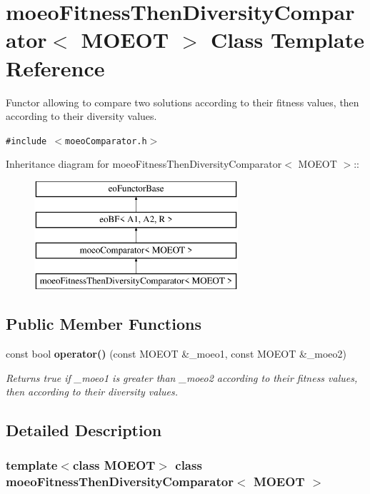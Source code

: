 \section{moeo\-Fitness\-Then\-Diversity\-Comparator$<$ MOEOT $>$ Class Template Reference}
\label{classmoeoFitnessThenDiversityComparator}
Functor allowing to compare two solutions according to their fitness values, then according to their diversity values.  


{\tt \#include $<$moeo\-Comparator.h$>$}

Inheritance diagram for moeo\-Fitness\-Then\-Diversity\-Comparator$<$ MOEOT $>$::\begin{figure}[H]
\begin{center}
\leavevmode
\includegraphics[height=4cm]{classmoeoFitnessThenDiversityComparator}
\end{center}
\end{figure}
\subsection*{Public Member Functions}
\begin{CompactItemize}
\item 
const bool {\bf operator()} (const MOEOT \&\_\-moeo1, const MOEOT \&\_\-moeo2)
\begin{CompactList}\small\item\em Returns true if \_\-moeo1 is greater than \_\-moeo2 according to their fitness values, then according to their diversity values. \item\end{CompactList}\end{CompactItemize}


\subsection{Detailed Description}
\subsubsection*{template$<$class MOEOT$>$ class moeo\-Fitness\-Then\-Diversity\-Comparator$<$ MOEOT $>$}


